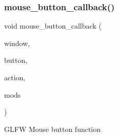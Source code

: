 \subsubsection{\texorpdfstring{mouse\+\_\+button\+\_\+callback()}{mouse\_button\_callback()}}
{\footnotesize\ttfamily void mouse\+\_\+button\+\_\+callback (\begin{DoxyParamCaption}\item[{G\+L\+F\+Wwindow $\ast$}]{window,  }\item[{int}]{button,  }\item[{int}]{action,  }\item[{int}]{mods }\end{DoxyParamCaption})}

G\+L\+FW Mouse button function 
